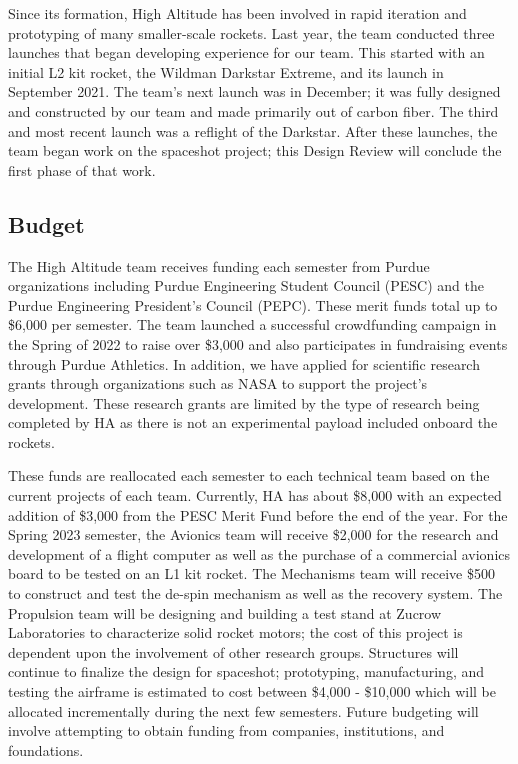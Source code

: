 Since its formation, High Altitude has been involved in rapid iteration and prototyping of many smaller-scale rockets. Last year, the team conducted three launches that began developing experience for our team. This started with an initial L2 kit rocket, the Wildman Darkstar Extreme, and its launch in September 2021. The team’s next launch was in December; it was fully designed and constructed by our team and made primarily out of carbon fiber. The third and most recent launch was a reflight of the Darkstar. After these launches, the team began work on the spaceshot project; this Design Review will conclude the first phase of that work.

\subsection{Budget}
The High Altitude team receives funding each semester from Purdue organizations including Purdue Engineering Student Council (PESC) and the Purdue Engineering President’s Council (PEPC).  These merit funds total up to \$6,000 per semester.  The team launched a successful crowdfunding campaign in the Spring of 2022 to raise over \$3,000 and also participates in fundraising events through Purdue Athletics.  In addition, we have applied for scientific research grants through organizations such as NASA to support the project’s development.  These research grants are limited by the type of research being completed by HA as there is not an experimental payload included onboard the rockets.

These funds are reallocated each semester to each technical team based on the current projects of each team.  Currently, HA has about \$8,000 with an expected addition of \$3,000 from the PESC Merit Fund before the end of the year.  For the Spring 2023 semester, the Avionics team will receive \$2,000 for the research and development of a flight computer as well as the purchase of a commercial avionics board to be tested on an L1 kit rocket.  The Mechanisms team will receive \$500 to construct and test the de-spin mechanism as well as the recovery system.  The Propulsion team will be designing and building a test stand at Zucrow Laboratories to characterize solid rocket motors; the cost of this project is dependent upon the involvement of other research groups.  Structures will continue to finalize the design for spaceshot; prototyping, manufacturing, and testing the airframe is estimated to cost between \$4,000 - \$10,000 which will be allocated  incrementally during the next few semesters.  Future budgeting will involve attempting to obtain funding from companies, institutions, and foundations.
